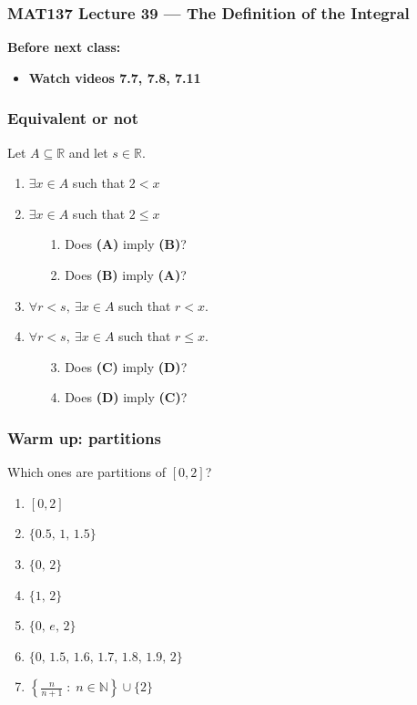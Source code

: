 \documentclass[14pt]{beamer}
\newcommand{\N}{\mathbb{N}}
\begin{document}
\begin{frame}
	\frametitle{MAT137 Lecture 39 --- The Definition of the Integral}

	\vfill
	{\bf Before next class:}
		\begin{itemize} \normalsize
			\item {\bf Watch videos 7.7, 7.8, 7.11}
		\end{itemize}
\end{frame}
	\begin{frame}[t]
		\frametitle{Equivalent or not}

		Let $A\subseteq \mathbb R$ and let $s\in \mathbb R$.
				\bigskip
		\begin{enumerate}
			\item\label{exa} $\exists x\in A$ such that $2<x$
			\item\label{exb} $\exists x\in A$ such that $2\leq x$

				\bigskip
				\begin{enumerate}
					\item[1.] Does \textbf{(A)} imply \textbf{(B)}?
					\item[2.] Does \textbf{(B)} imply \textbf{(A)}?
				\end{enumerate}
				\bigskip

			\item $\forall r<s,\ \exists x\in A$ such that $r<x$.
			\item $\forall r<s,\ \exists x\in A$ such that $r\leq x$.
				\bigskip
				\begin{enumerate}
					\item[3.] Does \textbf{(C)} imply \textbf{(D)}?
					\item[4.] Does \textbf{(D)} imply \textbf{(C)}?
				\end{enumerate}
				\bigskip

		\end{enumerate}
	\end{frame}
	\begin{frame}[t]
		\frametitle{Warm up: partitions}

		Which ones are partitions of $[0,2]$?

		\begin{enumerate}
			\item ${\displaystyle [0,2]}$

			\item ${\displaystyle \{0.5, \,1, \,1.5\}}$

			\item ${\displaystyle \{0,\,2\}}$

			\item ${\displaystyle \{1,\,2\}}$

			\item ${\displaystyle \{0, \,e, \,2 \}}$

			\item ${\displaystyle \{0, \,1.5, \,1.6, \,1.7, \,1.8, \,1.9, \,2\}}$

			\item ${\displaystyle  \left\{ \frac{n}{n+1} \; : \; n \in \N \right\} \cup \{ 2 \} }$
		\end{enumerate}
	\end{frame}
\end{document}
